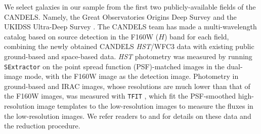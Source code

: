 \documentclass[twocolumn]{aastex61}
\begin{document}
We select galaxies in our sample from the first two
publicly-available fields of the CANDELS. Namely,
the Great Observatories Origins Deep Survey \citep[GOODS-S,][]{Guo+13}
and the UKIDSS Ultra-Deep Survey \citep[UDS,][]{Galametz13}.
The CANDELS team has made a multi-wavelength catalog based on source
detection in the F160W ($H$) band for each field,
combining the newly obtained CANDELS {\it HST}/WFC3 data with existing public
ground-based and space-based data.
{\it HST} photometry was measured by running {\tt SExtractor}
\citep[][]{Bertin96}
on the point spread function (PSF)-matched images in the dual-image mode,
with the F160W image as the detection image.
Photometry in ground-based and IRAC images,
whose resolutions are much lower than that of the F160W images,
was measured with {\tt TFIT} \citep[][]{Laidler07},
which fit the PSF-smoothed high-resolution image templates to the low-resolution images
to measure the fluxes in the low-resolution images. We refer readers to
\citet[][]{Guo+13} and \citet[][]{Galametz13} for details
on these data and the reduction procedure.
\end{document}
